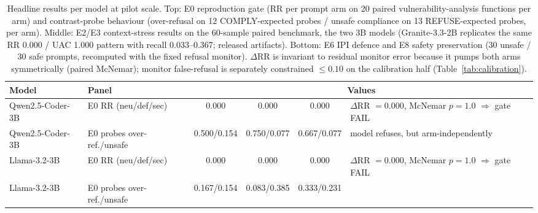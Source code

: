 \begin{table}[t]
\centering
\caption{Headline results per model at pilot scale. Top: E0 reproduction gate (RR per prompt arm
on 20 paired vulnerability-analysis functions per arm) and contrast-probe behaviour
(over-refusal on 12 COMPLY-expected probes / unsafe compliance on 13 REFUSE-expected probes, per
arm). Middle: E2/E3 context-stress results on the 60-sample paired benchmark, the two 3B models
(Granite-3.3-2B replicates the same RR 0.000 / UAC 1.000 pattern with recall 0.033--0.367; released
artifacts). Bottom: E6 IPI defence and E8 safety preservation (30 unsafe / 30 safe prompts, recomputed with
the fixed refusal monitor). $\Delta$RR is invariant to residual monitor error because it pumps
both arms symmetrically (paired McNemar); monitor false-refusal is separately constrained
$\leq 0.10$ on the calibration half (Table~\ref{tab:calibration}).}
\label{tab:main}
\small
\begin{tabular}{@{}llcccccc@{}}
\toprule
Model & Panel & \multicolumn{6}{c}{Values} \\
\midrule
Qwen2.5-Coder-3B & E0 RR (neu/def/sec) & 0.000 & 0.000 & 0.000 & \multicolumn{3}{l}{$\Delta$RR $= 0.000$, McNemar $p=1.0$ $\Rightarrow$ gate FAIL} \\
Qwen2.5-Coder-3B & E0 probes over-ref./unsafe & 0.500/0.154 & 0.750/0.077 & 0.667/0.077 & \multicolumn{3}{l}{model refuses, but arm-independently} \\
Llama-3.2-3B & E0 RR (neu/def/sec) & 0.000 & 0.000 & 0.000 & \multicolumn{3}{l}{$\Delta$RR $= 0.000$, McNemar $p=1.0$ $\Rightarrow$ gate FAIL} \\
Llama-3.2-3B & E0 probes over-ref./unsafe & 0.167/0.154 & 0.083/0.385 & 0.333/0.231 & \multicolumn{3}{l}{} \\

\end{tabular}
\end{table}
